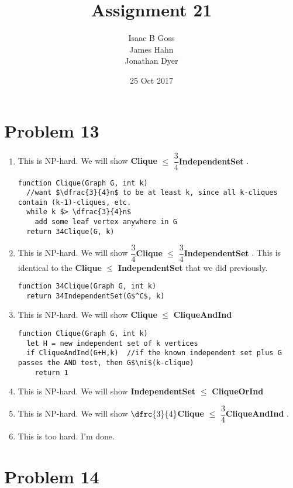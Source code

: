 \documentclass{article}
\author{Isaac B Goss\\ James Hahn\\ Jonathan Dyer}
\title{Assignment 21}
\date{25 Oct 2017}
\providecommand{\prob}[1]{\section*{Problem #1}}
\providecommand{\reducible}[2]{
  \textbf{#1} $\leq$ \textbf{#2}
}
\begin{document}
\maketitle

\prob{13}
\begin{enumerate}[label=(\alph*)]
  \item This is NP-hard. We will show \reducible{Clique}{$\dfrac{3}{4}$IndependentSet}.
  \begin{lstlisting}
function Clique(Graph G, int k)
  //want $\dfrac{3}{4}n$ to be at least k, since all k-cliques contain (k-1)-cliques, etc.
  while k $> \dfrac{3}{4}n$
    add some leaf vertex anywhere in G
  return 34Clique(G, k)
  \end{lstlisting}

  \item This is NP-hard. We will show \reducible{$\dfrac{3}{4}$Clique}{$\dfrac{3}{4}$IndependentSet}. This is identical to the \reducible{Clique}{IndependentSet} that we did previously.
  \begin{lstlisting}
function 34Clique(Graph G, int k)
  return 34IndependentSet(G$^C$, k)
  \end{lstlisting}

  \item This is NP-hard. We will show \reducible{Clique}{CliqueAndInd}
  \begin{lstlisting}
function Clique(Graph G, int k)
  let H = new independent set of k vertices
  if CliqueAndInd(G+H,k)  //if the known independent set plus G passes the AND test, then G$\ni$(k-clique)
    return 1
  \end{lstlisting}

  \item This is NP-hard. We will show \reducible{IndependentSet}{CliqueOrInd}

  \item This is NP-hard. We will show \reducible{$\dfrc{3}{4}$Clique}{$\dfrac{3}{4}$CliqueAndInd}.

  \item This is too hard. I'm done.
\end{enumerate}


\prob{14}
\end{document}
